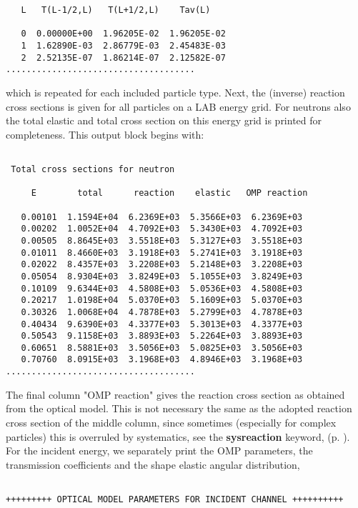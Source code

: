 \begin{samplecase}
{\begin{verbatim}
   L   T(L-1/2,L)   T(L+1/2,L)    Tav(L)
  
   0  0.00000E+00  1.96205E-02  1.96205E-02
   1  1.62890E-03  2.86779E-03  2.45483E-03
   2  2.52135E-07  1.86214E-07  2.12582E-07
.....................................
\end{verbatim} } \renewcommand{\baselinestretch}{1.07}\small\normalsize
\noindent
which is repeated for each included particle type.
Next, the (inverse) reaction cross sections 
is given for all particles on a LAB energy grid. For neutrons also the total 
elastic and total cross section on this energy grid is printed for completeness.
This output block begins with:

{\small \begin{verbatim}

 Total cross sections for neutron
 
     E        total      reaction    elastic   OMP reaction
 
   0.00101  1.1594E+04  6.2369E+03  5.3566E+03  6.2369E+03
   0.00202  1.0052E+04  4.7092E+03  5.3430E+03  4.7092E+03
   0.00505  8.8645E+03  3.5518E+03  5.3127E+03  3.5518E+03
   0.01011  8.4660E+03  3.1918E+03  5.2741E+03  3.1918E+03
   0.02022  8.4357E+03  3.2208E+03  5.2148E+03  3.2208E+03
   0.05054  8.9304E+03  3.8249E+03  5.1055E+03  3.8249E+03
   0.10109  9.6344E+03  4.5808E+03  5.0536E+03  4.5808E+03
   0.20217  1.0198E+04  5.0370E+03  5.1609E+03  5.0370E+03
   0.30326  1.0068E+04  4.7878E+03  5.2799E+03  4.7878E+03
   0.40434  9.6390E+03  4.3377E+03  5.3013E+03  4.3377E+03
   0.50543  9.1158E+03  3.8893E+03  5.2264E+03  3.8893E+03
   0.60651  8.5881E+03  3.5056E+03  5.0825E+03  3.5056E+03
   0.70760  8.0915E+03  3.1968E+03  4.8946E+03  3.1968E+03
.....................................
\end{verbatim} } \renewcommand{\baselinestretch}{1.07}\small\normalsize
\noindent
The final column "OMP reaction" gives the reaction cross section as obtained 
from the optical model. This is not necessary the same as the adopted reaction 
cross section of the middle column, since sometimes (especially for complex 
particles) this is overruled by 
systematics, see the {\bf sysreaction} keyword, (p.  \pageref{key:sysreaction}).
For the incident energy, we separately print the OMP parameters, the 
transmission coefficients and the shape elastic angular distribution,

{\small \begin{verbatim}

+++++++++ OPTICAL MODEL PARAMETERS FOR INCIDENT CHANNEL ++++++++++
 

\end{verbatim}}
\end{samplecase}
